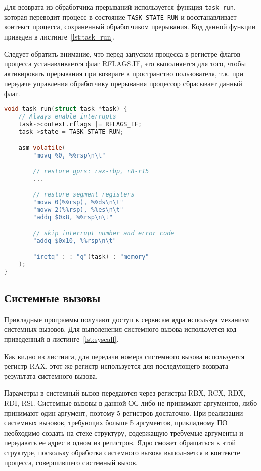 Для возврата из обработчика прерываний используется функция \texttt{task\_run},
которая переводит процесс в состояние \texttt{TASK\_STATE\_RUN} и восстанавливает
контекст процесса, сохраненный обработчиком прерывания. Код данной функции
приведен в листинге~\ref{lst:task_run}.

Следует обратить внимание, что перед запуском процесса в регистре флагов процесса
устанавливается флаг RFLAGS.IF, это выполняется для того, чтобы активировать прерывания
при возврате в пространство пользователя, т.к. при передаче управления обработчику
прерывания процессор сбрасывает данный флаг.

\begin{lstlisting}[language=C,
caption={Запуск процесса},
label={lst:task_run}]
void task_run(struct task *task) {
	// Always enable interrupts
	task->context.rflags |= RFLAGS_IF;
	task->state = TASK_STATE_RUN;

	asm volatile(
		"movq %0, %%rsp\n\t"

		// restore gprs: rax-rbp, r8-r15
		...

		// restore segment registers
		"movw 0(%%rsp), %%ds\n\t"
		"movw 2(%%rsp), %%es\n\t"
		"addq $0x8, %%rsp\n\t"

		// skip interrupt_number and error_code
		"addq $0x10, %%rsp\n\t"

		"iretq" : : "g"(task) : "memory"
	);
}
\end{lstlisting}


\subsection{Системные вызовы}
Прикладные программы получают доступ к сервисам ядра используя механизм системных
вызовов. Для выполенения системного вызова используется код приведенный в
листинге~\ref{lst:syscall}.

Как видно из листнига, для передачи номера
системного вызова используется регистр RAX, этот же регистр используется
для последующего возврата результата системного вызова.

Параметры в системный вызов передаются через регистры RBX, RCX, RDX, RDI, RSI.
Системные вызовы в данной ОС либо не принимают аргументов, либо принимают один
аргумент, поэтому 5 регистров достаточно. При реализации системных вызовов,
требующих больше 5 аргументов, прикладному ПО необходимо создать на стеке
структуру, содержащую требуемые аргументы и передавать ее адрес в одном из регистров.
Ядро сможет обращаться к этой структуре, поскольку обработка системного вызова
выполняется в контексте процесса, совершившего системный вызов.

